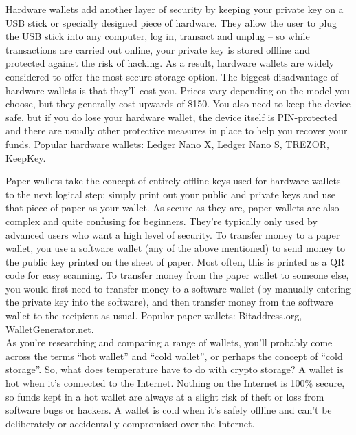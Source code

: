 Hardware wallets add another layer of security by keeping your private key on a USB stick or specially designed piece of hardware. They allow the user to plug the USB stick into any computer, log in, transact and unplug – so while transactions are carried out online, your private key is stored offline and protected against the risk of hacking. As a result, hardware wallets are widely considered to offer the most secure storage option. The biggest disadvantage of hardware wallets is that they’ll cost you. Prices vary depending on the model you choose, but they generally cost upwards of \$150. You also need to keep the device safe, but if you do lose your hardware wallet, the device itself is PIN-protected and there are usually other protective measures in place to help you recover your funds. Popular hardware wallets: Ledger Nano X, Ledger Nano S, TREZOR, KeepKey.

Paper wallets take the concept of entirely offline keys used for hardware wallets to the next logical step: simply print out your public and private keys and use that piece of paper as your wallet. As secure as they are, paper wallets are also complex and quite confusing for beginners. They’re typically only used by advanced users who want a high level of security. To transfer money to a paper wallet, you use a software wallet (any of the above mentioned) to send money to the public key printed on the sheet of paper. Most often, this is printed as a QR code for easy scanning. To transfer money from the paper wallet to someone else, you would first need to transfer money to a software wallet (by manually entering the private key into the software), and then transfer money from the software wallet to the recipient as usual. Popular paper wallets: Bitaddress.org, WalletGenerator.net.\\

As you’re researching and comparing a range of wallets, you’ll probably come across the terms “hot wallet” and “cold wallet”, or perhaps the concept of “cold storage”. So, what does temperature have to do with crypto storage? A wallet is hot when it's connected to the Internet. Nothing on the Internet is 100\% secure, so funds kept in a hot wallet are always at a slight risk of theft or loss from software bugs or hackers. A wallet is cold when it's safely offline and can't be deliberately or accidentally compromised over the Internet.\\

